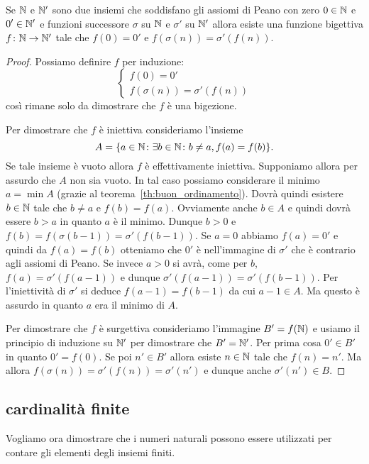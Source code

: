 \begin{theorem}
  Se ${\mathbb N}$ e ${\mathbb N}'$ sono due insiemi che soddisfano gli assiomi di Peano 
  con zero $0\in {\mathbb N}$ e $0'\in {\mathbb N}'$ e funzioni 
  successore $\sigma$ su ${\mathbb N}$ e $\sigma'$ su ${\mathbb N}'$ allora
  esiste una funzione bigettiva $f\colon {\mathbb N}\to {\mathbb N}'$ tale che 
  $f(0) = 0'$ e $f(\sigma(n)) = \sigma'(f(n))$.
\end{theorem}
%
\begin{proof}
Possiamo definire $f$ per induzione:
\[
\begin{cases}
  f(0) = 0' \\ 
  f(\sigma(n)) = \sigma'(f(n))
\end{cases}  
\]
così rimane solo da dimostrare che $f$ è una bigezione.

Per dimostrare che $f$ è iniettiva consideriamo l'insieme 
\[
  A={\left\{ a\in {\mathbb N}\colon \exists b\in {\mathbb N}\colon b\neq a, f(a)=f(b) \right\}}.
\]
Se tale insieme è vuoto allora $f$ è effettivamente iniettiva.
Supponiamo allora per assurdo che $A$ non sia vuoto.
In tal caso possiamo considerare il minimo $a=\min A$ 
(grazie al teorema~\ref{th:buon_ordinamento}).
Dovrà quindi esistere $b\in {\mathbb N}$ tale che $b\neq a$ e $f(b)=f(a)$.
Ovviamente anche $b\in A$ e quindi dovrà essere $b>a$ in quanto
$a$ è il minimo. Dunque $b>0$ e $f(b) = f(\sigma(b-1))
=\sigma'(f(b-1))$. Se $a=0$ abbiamo $f(a)=0'$ e quindi da $f(a)=f(b)$ 
otteniamo che $0'$ è nell'immagine di $\sigma'$ che è contrario 
agli assiomi di Peano. 
Se invece $a>0$ si avrà, come per $b$,
$f(a)=\sigma'(f(a-1))$ e dunque $\sigma'(f(a-1)) = \sigma'(f(b-1))$.
Per l'iniettività di $\sigma'$ si deduce $f(a-1)=f(b-1)$ da cui 
$a-1 \in A$. Ma questo è assurdo in quanto $a$ era il minimo di $A$.

Per dimostrare che $f$ è surgettiva consideriamo l'immagine 
$B'=f({\mathbb N})$ e usiamo il principio di induzione su ${\mathbb N}'$ 
per dimostrare che $B'={\mathbb N}'$.
Per prima cosa $0'\in B'$ in quanto $0'=f(0)$.
Se poi $n'\in B'$ allora esiste $n\in {\mathbb N}$ tale che $f(n)=n'$.
Ma allora $f(\sigma(n))=\sigma'(f(n))=\sigma'(n')$ 
e dunque anche $\sigma'(n')\in B$. 
\end{proof}

\subsection{cardinalità finite}

Vogliamo ora dimostrare che i numeri naturali possono essere utilizzati 
per contare gli elementi degli insiemi finiti.

